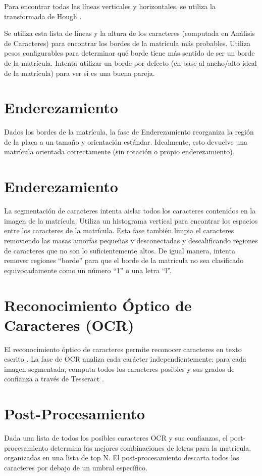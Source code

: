 Para encontrar todas las líneas verticales y horizontales, se utiliza la transformada de Hough \parencite{OpenCV2016-kr}.

Se utiliza esta lista de líneas y la altura de los caracteres (computada en Análisis de Caracteres) para encontrar los bordes de la matrícula más probables. Utiliza pesos configurables para determinar qué borde tiene más sentido de ser un borde de la matrícula. Intenta utilizar un borde por defecto (en base al ancho/alto ideal de la matrícula) para ver si es una buena pareja.

\section{Enderezamiento}
Dados los bordes de la matrícula, la fase de Enderezamiento reorganiza la región de la placa a un tamaño y orientación estándar. Idealmente, esto devuelve una matrícula orientada correctamente (sin rotación o propio enderezamiento).

\section{Enderezamiento}
La segmentación de caracteres intenta aislar todos los caracteres contenidos en la imagen de la matrícula. Utiliza un histograma vertical para encontrar los espacios entre los caracteres de la matrícula. Esta fase también limpia el caracteres removiendo las masas amorfas pequeñas y desconectadas y descalificando regiones de caracteres que no son lo suficientemente altos. De igual manera, intenta remover regiones “borde” para que el borde de la matrícula no sea clasificado equivocadamente como un número “1” o una letra “l”. 

\section{Reconocimiento Óptico de Caracteres (OCR)}
El reconocimiento óptico de caracteres permite reconocer caracteres en texto escrito \parencite{Mithe2013-yn}. La fase de OCR analiza cada carácter independientemente: para cada imagen segmentada, computa todos los caracteres posibles  y sus grados de confianza a través de Tesseract \parencite{Tesseract-OCR2016-fe}.
\section{Post-Procesamiento}
Dada una lista de todos los posibles caracteres OCR y sus confianzas, el post-procesamiento determina las mejores combinaciones de letras para la matrícula, organizadas en una lista de top N. El post-procesamiento descarta todos los caracteres por debajo de un umbral específico. 

